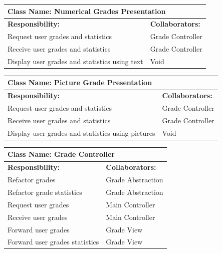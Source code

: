 \documentclass[]{article}
\begin{document}
	\begin{table}[H]
	\centering
		\begin{tabular}{|p{9cm}|p{3cm}|}
		\hline
		 \multicolumn{2}{|l|}{\textbf{Class Name: Numerical Grades Presentation}} \\
		\hline
		\textbf{Responsibility:} & \textbf{Collaborators:} \\
		\hline
		Request user grades and statistics & Grade Controller\\
		\hline
	    Receive user grades and statistics & Grade Controller\\
	    \hline
	    Display user grades and statistics using text& Void\\
	    \hline 
		\end{tabular}
	\end{table}
	
	\begin{table}[H]
	\centering
		\begin{tabular}{|p{9cm}|p{3cm}|}
		\hline
		 \multicolumn{2}{|l|}{\textbf{Class Name: Picture Grade Presentation}} \\
		\hline
		\textbf{Responsibility:} & \textbf{Collaborators:} \\
		\hline
		Request user grades and statistics & Grade Controller\\
		\hline
	    Receive user grades and statistics & Grade Controller\\
	    \hline
	    Display user grades and statistics using pictures& Void\\
	    \hline 
		\end{tabular}
	\end{table}
	
	\begin{table}[H]
	\centering
		\begin{tabular}{|p{9cm}|p{3cm}|}
		\hline
		 \multicolumn{2}{|l|}{\textbf{Class Name: Grade Controller}} \\
		\hline
		\textbf{Responsibility:} & \textbf{Collaborators:} \\
		\hline
	    Refactor grades & Grade Abstraction\\
		\hline
		Refactor grade statistics & Grade Abstraction\\
		\hline
	    Request user grades & Main Controller\\
		\hline
		Receive user grades & Main Controller\\
		\hline
		Forward user grades & Grade View\\
		\hline
		Forward user grades statistics & Grade View\\
		\hline
		\end{tabular}
	\end{table}
	
\end{document}
